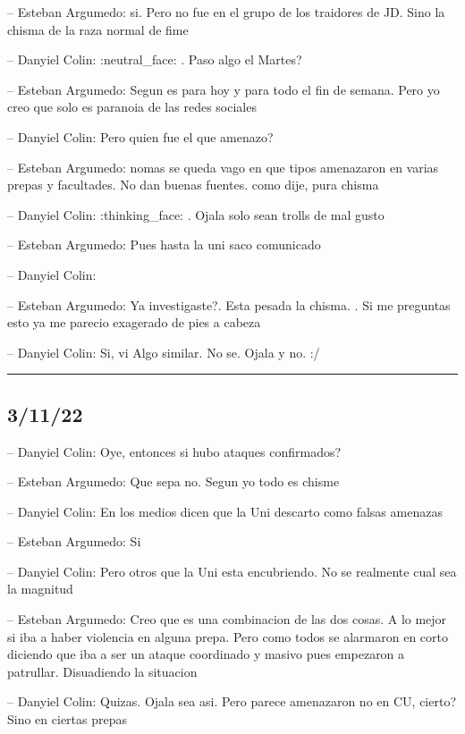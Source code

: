 -- Esteban Argumedo: si. Pero no fue en el grupo de los traidores de JD.
Sino la chisma de la raza normal de fime

-- Danyiel Colin: :neutral\_face: . Paso algo el Martes?

-- Esteban Argumedo: Segun es para hoy y para todo el fin de semana.
Pero yo creo que solo es paranoia de las redes sociales

-- Danyiel Colin: Pero quien fue el que amenazo?

-- Esteban Argumedo: nomas se queda vago en que tipos amenazaron en
varias prepas y facultades. No dan buenas fuentes. como dije, pura
chisma

-- Danyiel Colin: :thinking\_face: . Ojala solo sean trolls de mal gusto

-- Esteban Argumedo: Pues hasta la uni saco comunicado

-- Danyiel Colin:

-- Esteban Argumedo: Ya investigaste?. Esta pesada la chisma. . Si me
preguntas esto ya me parecio exagerado de pies a cabeza

-- Danyiel Colin: Si, vi Algo similar. No se. Ojala y no. :/

\begin{center}\rule{0.5\linewidth}{0.5pt}\end{center}

\hypertarget{section-30}{%
\subsection{3/11/22}\label{section-30}}

-- Danyiel Colin: Oye, entonces si hubo ataques confirmados?

-- Esteban Argumedo: Que sepa no. Segun yo todo es chisme

-- Danyiel Colin: En los medios dicen que la Uni descarto como falsas
amenazas

-- Esteban Argumedo: Si

-- Danyiel Colin: Pero otros que la Uni esta encubriendo. No se
realmente cual sea la magnitud

-- Esteban Argumedo: Creo que es una combinacion de las dos cosas. A lo
mejor si iba a haber violencia en alguna prepa. Pero como todos se
alarmaron en corto diciendo que iba a ser un ataque coordinado y masivo
pues empezaron a patrullar. Disuadiendo la situacion

-- Danyiel Colin: Quizas. Ojala sea asi. Pero parece amenazaron no en
CU, cierto? Sino en ciertas prepas

